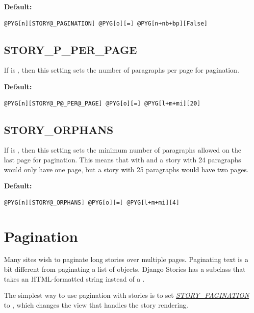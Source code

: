 \documentclass[letterpaper,10pt,english]{manual}
\begin{document}
\textbf{Default:}

\begin{Verbatim}[commandchars=@\[\]]
@PYG[n][STORY@_PAGINATION] @PYG[o][=] @PYG[n+nb+bp][False]
\end{Verbatim}
\hypertarget{story-p-per-page}{}

\section{STORY\_P\_PER\_PAGE}

If  is , then this setting sets the number of paragraphs per page for pagination.

\textbf{Default:}

\begin{Verbatim}[commandchars=@\[\]]
@PYG[n][STORY@_P@_PER@_PAGE] @PYG[o][=] @PYG[l+m+mi][20]
\end{Verbatim}
\hypertarget{story-orphans}{}

\section{STORY\_ORPHANS}

If  is , then this setting sets the minimum number of paragraphs allowed on the last page for pagination. This means that with  and  a story with 24 paragraphs would only have one page, but a story with 25 paragraphs would have two pages.

\textbf{Default:}

\begin{Verbatim}[commandchars=@\[\]]
@PYG[n][STORY@_ORPHANS] @PYG[o][=] @PYG[l+m+mi][4]
\end{Verbatim}

\resetcurrentobjects
\hypertarget{--doc-pagination}{}

\hypertarget{pagination}{}\chapter{Pagination}

Many sites wish to paginate long stories over multiple pages. Paginating text is a bit different from paginating a list of objects. Django Stories has a  subclass that takes an HTML-formatted string instead of a .

The simplest way to use pagination with stories is to set \hyperlink{story-pagination}{\emph{STORY\_PAGINATION}} to , which changes the view that handles the story rendering.
\end{document}
